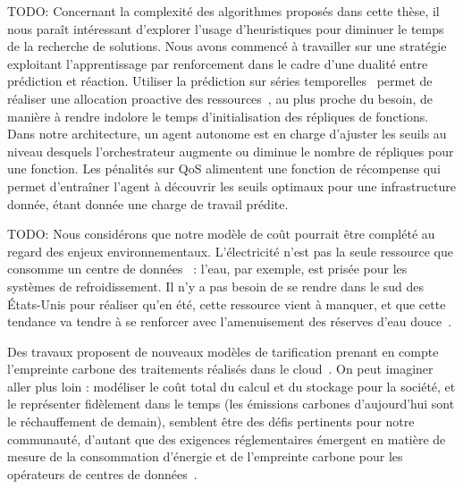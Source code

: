 TODO: Concernant la complexité des algorithmes proposés dans cette thèse, il nous paraît intéressant d'explorer l'usage d'heuristiques pour diminuer le temps de la recherche de solutions. Nous avons commencé à travailler sur une stratégie exploitant l'apprentissage par renforcement dans le cadre d'une dualité entre prédiction et réaction. Utiliser la prédiction sur séries temporelles~\cite{bauerTimeSeriesForecasting2020} permet de réaliser une allocation proactive des ressources~\cite{parkGraphNeuralNetworkBased2024}, au plus proche du besoin, de manière à rendre indolore le temps d'initialisation des répliques de fonctions. Dans notre architecture, un agent autonome est en charge d'ajuster les seuils au niveau desquels l'orchestrateur augmente ou diminue le nombre de répliques pour une fonction. Les pénalités sur \gls{QoS} alimentent une fonction de récompense qui permet d'entraîner l'agent à découvrir les seuils optimaux pour une infrastructure donnée, étant donnée une charge de travail prédite.



TODO: Nous considérons que notre modèle de coût pourrait être complété au regard des enjeux environnementaux. L'électricité n'est pas la seule ressource que consomme un centre de données~\cite{rickeCountrylevelSocialCost2018} : l'eau, par exemple, est prisée pour les systèmes de refroidissement. Il n'y a pas besoin de se rendre dans le sud des États-Unis pour réaliser qu'en été, cette ressource vient à manquer, et que cette tendance va tendre à se renforcer avec l'amenuisement des réserves d'eau douce~\cite{EauAvecRessource2024}.

Des travaux proposent de nouveaux modèles de tarification prenant en compte l'empreinte carbone des traitements réalisés dans le cloud~\cite{linBridgingSustainabilityGap2024}. On peut imaginer aller plus loin : modéliser le coût total du calcul et du stockage pour la société, et le représenter fidèlement dans le temps (les émissions carbones d'aujourd'hui sont le réchauffement de demain), semblent être des défis pertinents pour notre communauté, d'autant que des exigences réglementaires émergent en matière de mesure de la consommation d'énergie et de l'empreinte carbone pour les opérateurs de centres de données~\cite{davisUptimeInstituteGlobal2022}.


